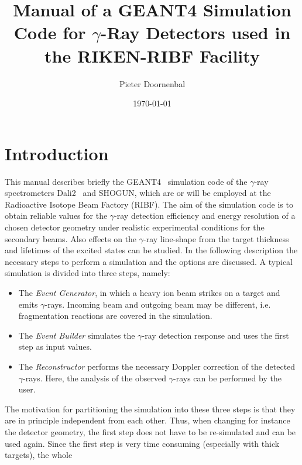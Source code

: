 \documentclass[12pt]{book}
\begin{document}
\pagestyle{headings}

\author{Pieter Doornenbal}
\date{\today} 
\title{Manual of a GEANT4 Simulation Code for $\gamma$-Ray Detectors used
  in the RIKEN-RIBF Facility}

\maketitle
\tableofcontents

\chapter{Introduction}
\sloppy
This manual describes briefly the GEANT4~\cite{GEANT4} simulation code of the $\gamma$-ray 
spectrometers Dali2~\cite{takeuchi:2014:nima} and SHOGUN, which are or will be employed at the 
Radioactive Isotope Beam Factory (RIBF).
The aim of the simulation code is to obtain reliable values for the $\gamma$-ray detection efficiency
and energy resolution of a chosen detector geometry under realistic experimental conditions
for the secondary beams. Also effects on the $\gamma$-ray line-shape from the target thickness and
lifetimes of the excited states can be studied. In the following description the necessary steps 
to perform a simulation and the options are discussed.\hfill{}
\linebreak{}
\linebreak{}
A typical simulation is divided into three steps, namely:
\begin{itemize}
\item The \textit{Event Generator}, in which a heavy ion beam strikes on a target and emits
  $\gamma$-rays. Incoming beam and outgoing beam may be different, i.e. fragmentation reactions
  are covered in the simulation.
\item The \textit{Event Builder} simulates the $\gamma$-ray detection response and uses the 
  first step as input values.
\item The \textit{Reconstructor} performs the necessary Doppler correction of the detected
  $\gamma$-rays. Here, the analysis of the observed $\gamma$-rays can be performed by the
  user.
\end{itemize}
The motivation for partitioning the simulation into these three steps is that they are in principle
independent from each other. Thus, when changing for instance the detector geometry, the first step
does not have to be re-simulated and can be used again. 
Since the first step is very time consuming (especially with thick targets), the whole
\end{document}
